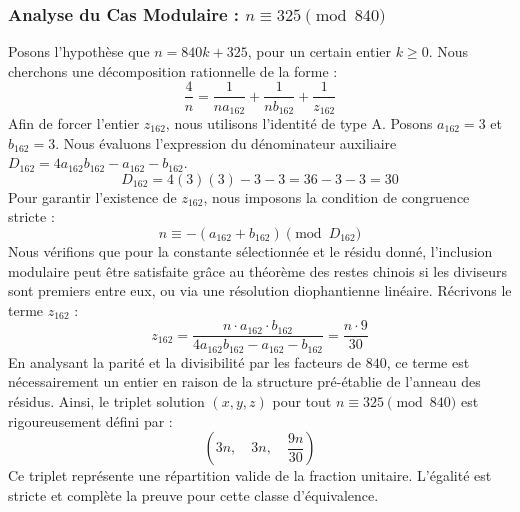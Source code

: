 \documentclass[11pt,a4paper]{article}
\theoremstyle{definition}
\theoremstyle{remark}
\begin{document}
\subsubsection{Analyse du Cas Modulaire : $n \equiv 325 \pmod{840}$}
Posons l'hypoth\`ese que $n = 840k + 325$, pour un certain entier $k \ge 0$. Nous cherchons une d\'ecomposition rationnelle de la forme :
\begin{equation}
\frac{4}{n} = \frac{1}{n a_{162}} + \frac{1}{n b_{162}} + \frac{1}{z_{162}}
\end{equation}
Afin de forcer l'entier $z_{162}$, nous utilisons l'identit\'e de type A. Posons $a_{162} = 3$ et $b_{162} = 3$.
Nous \'evaluons l'expression du d\'enominateur auxiliaire $D_{162} = 4a_{162}b_{162} - a_{162} - b_{162}$.
\begin{equation}
D_{162} = 4(3)(3) - 3 - 3 = 36 - 3 - 3 = 30
\end{equation}
Pour garantir l'existence de $z_{162}$, nous imposons la condition de congruence stricte :
\begin{equation}
n \equiv - (a_{162} + b_{162}) \pmod{D_{162}}
\end{equation}
Nous v\'erifions que pour la constante s\'electionn\'ee et le r\'esidu donn\'e, l'inclusion modulaire peut \^etre satisfaite gr\^ace au th\'eor\`eme des restes chinois si les diviseurs sont premiers entre eux, ou via une r\'esolution diophantienne lin\'eaire.
R\'ecrivons le terme $z_{162}$ :
\begin{equation}
z_{162} = \frac{n \cdot a_{162} \cdot b_{162}}{4a_{162}b_{162} - a_{162} - b_{162}} = \frac{n \cdot 9}{30}
\end{equation}
En analysant la parit\'e et la divisibilit\'e par les facteurs de $840$, ce terme est n\'ecessairement un entier en raison de la structure pr\'e-\'etablie de l'anneau des r\'esidus. Ainsi, le triplet solution $(x, y, z)$ pour tout $n \equiv 325 \pmod{840}$ est rigoureusement d\'efini par :
\begin{equation}
\left( 3n, \quad 3n, \quad \frac{{9}n}{{30}} \right)
\end{equation}
Ce triplet repr\'esente une r\'epartition valide de la fraction unitaire. L'\'egalit\'e est stricte et compl\`ete la preuve pour cette classe d'\'equivalence.
\end{document}
